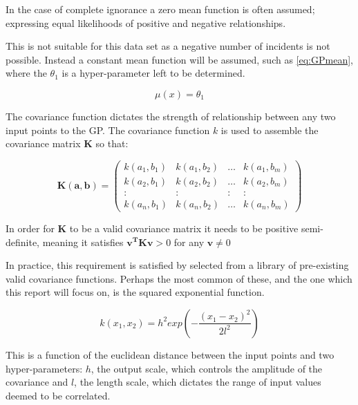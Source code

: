 \documentclass[a4paper,11pt]{report}
\begin{document}
In the case of complete ignorance a zero mean function is often assumed; expressing equal likelihoods of positive and negative relationships. 

This is not suitable for this data set as a negative number of incidents is not possible. Instead a constant mean function will be assumed, such as \ref{eq:GPmean}, where the \(\theta_1\) is a hyper-parameter left to be determined.

\begin{equation} \label{eq:GPmean}
\mu (x) = \theta_1
\end{equation}

\par

The covariance function dictates the strength of relationship between any two input points to the GP. The covariance function \(k\) is used to assemble the covariance matrix \(\mathbf{K}\) so that: 

\begin{equation}
\mathbf{K(a,b)} =  \left( \begin{array}{cccc}
k(a_1,b_1) & k(a_1,b_2) &  \dots & k(a_1,b_m) \\
k(a_2,b_1) & k(a_2,b_2) &  \dots & k(a_2,b_m) \\
: & : & : & : \\
k(a_n,b_1) & k(a_n,b_2) &  \dots & k(a_n,b_m)  \end{array} \right) 
\end{equation}

In order for \(\mathbf{K}\) to be a valid covariance matrix it needs to be positive semi-definite, meaning it satisfies \( \mathbf{v^{T} K v} > 0\) for any \( \mathbf{v} \neq 0 \)

In practice, this requirement is satisfied by selected from a library of pre-existing valid covariance functions. Perhaps the most common of these, and the one which this report will focus on, is the squared exponential function.

\begin{equation}
k(x_1,x_2) = h^2 exp(- \frac{(x_1-x_2)^2}{2 l^2})
\end{equation} 

This is a function of the euclidean distance between the input points and two hyper-parameters: \(h\), the output scale, which controls the amplitude of the covariance and \(l\), the length scale, which dictates the range of input values deemed to be correlated. 
\end{document}
